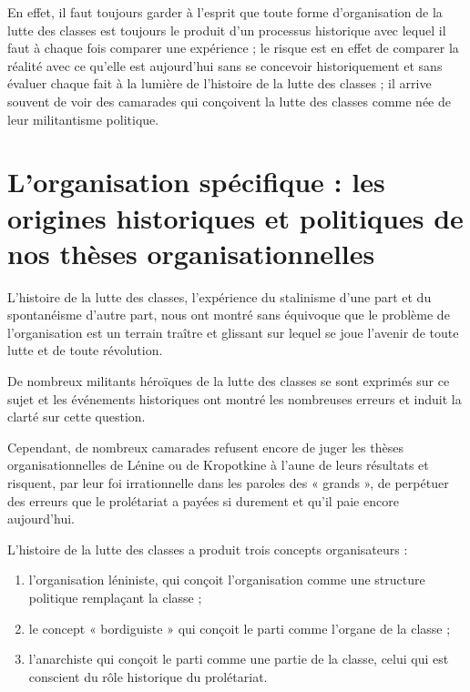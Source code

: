 En effet, il faut toujours garder à l'esprit que toute forme d'organisation de la lutte des classes est toujours le produit d'un processus historique avec lequel il faut à chaque fois comparer une expérience ; le risque est en effet de comparer la réalité avec ce qu'elle est aujourd'hui sans se concevoir historiquement et sans évaluer chaque fait à la lumière de l'histoire de la lutte des classes ; il arrive souvent de voir des camarades qui conçoivent la lutte des classes comme née de leur militantisme politique.

\chapter{L'organisation spécifique : les origines historiques et politiques de nos thèses organisationnelles}\hypertarget{lorganisation-spcifique--les-origines-historiques-et-politiques-de-nos-thses-organisationnelles}{}\label{lorganisation-spcifique--les-origines-historiques-et-politiques-de-nos-thses-organisationnelles}

L'histoire de la lutte des classes, l'expérience du stalinisme d'une part et du spontanéisme d'autre part, nous ont montré sans équivoque que le problème de l'organisation est un terrain traître et glissant sur lequel se joue l'avenir de toute lutte et de toute révolution.

De nombreux militants héroïques de la lutte des classes se sont exprimés sur ce sujet et les événements historiques ont montré les nombreuses erreurs et induit la clarté sur cette question.

Cependant, de nombreux camarades refusent encore de juger les thèses organisationnelles de Lénine ou de Kropotkine à l'aune de leurs résultats et risquent, par leur foi irrationnelle dans les paroles des « grands », de perpétuer des erreurs que le prolétariat a payées si durement et qu'il paie encore aujourd'hui.

L'histoire de la lutte des classes a produit trois concepts organisateurs :

\begin{enumerate}
\item{} l'organisation léniniste, qui conçoit l'organisation comme une structure politique remplaçant la classe ;
\item{} le concept « bordiguiste » qui conçoit le parti comme l'organe de la classe ;
\item{} l'anarchiste qui conçoit le parti comme une partie de la classe, celui qui est conscient du rôle historique du prolétariat.
\end{enumerate}

